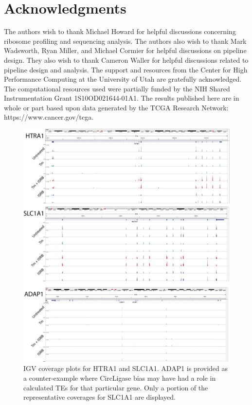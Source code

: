 \documentclass[11pt, a4paper, oneside]{article}
\newcommand{\beginsupplement}{%
  \setcounter{table}{0}
  \renewcommand{\thetable}{S\arabic{table}}%
  \setcounter{figure}{0}
  \renewcommand{\thefigure}{S\arabic{figure}}%
}
\begin{document}
\section*{Acknowledgments}
The authors wish to thank Michael Howard for helpful discussions concerning ribosome profiling and sequencing analysis. The authors also wish to thank Mark Wadsworth, Ryan Miller, and Michael Cormier for helpful discussions on pipeline design. They also wish to thank Cameron Waller for helpful discussions related to pipeline design and analysis. The support and resources from the Center for High Performance Computing at the University of Utah are gratefully acknowledged. The computational resources used were partially funded by the NIH Shared Instrumentation Grant 1S10OD021644-01A1. The results published here are in whole or part based upon data generated by the TCGA Research Network: https://www.cancer.gov/tcga.





\beginsupplement

\begin{figure}
\centering
  \includegraphics[width=180mm]{figures/xpresspipe_supplement3.png}
  \caption{IGV coverage plots for HTRA1 and SLC1A1. ADAP1 is provided as a counter-example where CircLigase bias may have had a role in calculated TEs for that particular gene. Only a portion of the representative coverages for SLC1A1 are displayed.}
  \label{fig:supplement3}
\end{figure}
\end{document}
